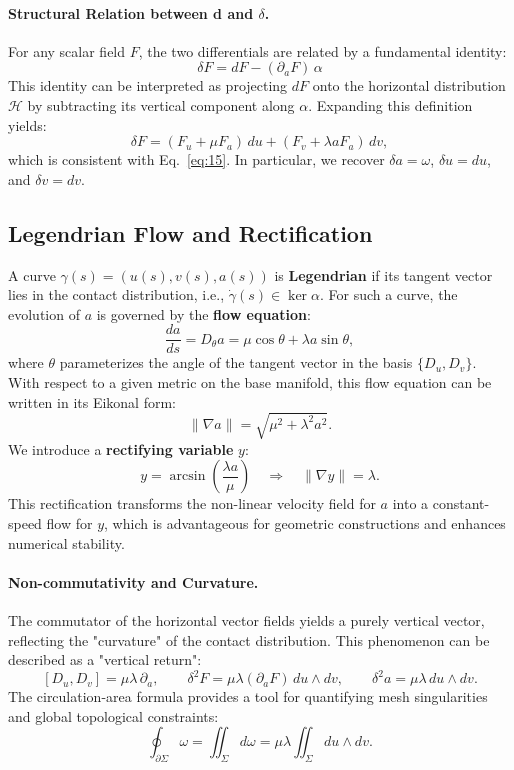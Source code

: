 \paragraph{Structural Relation between d and $\delta$.}
For any scalar field $F$, the two differentials are related by a fundamental identity:
\[
\boxed{ \delta F = dF - (\partial_a F)\,\alpha }
\]
This identity can be interpreted as projecting $dF$ onto the horizontal distribution $\mathcal{H}$ by subtracting its vertical component along $\alpha$. Expanding this definition yields:
\[
\delta F = (F_u + \mu F_a)\,du + (F_v + \lambda a F_a)\,dv,
\]
which is consistent with Eq.~\eqref{eq:15}. In particular, we recover $\delta a = \omega$, $\delta u = du$, and $\delta v = dv$.

\subsection{Legendrian Flow and Rectification}

A curve $\gamma(s) = (u(s), v(s), a(s))$ is \textbf{Legendrian} if its tangent vector lies in the contact distribution, i.e., $\dot\gamma(s) \in \ker\alpha$. For such a curve, the evolution of $a$ is governed by the \textbf{flow equation}:
\begin{equation}\label{eq:4}\tag{4}
\frac{da}{ds} = D_\theta a = \mu\cos\theta + \lambda a\sin\theta,
\end{equation}
where $\theta$ parameterizes the angle of the tangent vector in the basis $\{D_u,D_v\}$. With respect to a given metric on the base manifold, this flow equation can be written in its Eikonal form:
\begin{equation}\label{eq:5}\tag{5}
\|\nabla a\| = \sqrt{\mu^2 + \lambda^2 a^2}.
\end{equation}
We introduce a \textbf{rectifying variable} $y$:
\begin{equation}\label{eq:6}\tag{6}
y = \arcsin\left(\frac{\lambda a}{\mu}\right) \quad\Rightarrow\quad \|\nabla y\| = \lambda.
\end{equation}
This rectification transforms the non-linear velocity field for $a$ into a constant-speed flow for $y$, which is advantageous for geometric constructions and enhances numerical stability.

\paragraph{Non-commutativity and Curvature.}
The commutator of the horizontal vector fields yields a purely vertical vector, reflecting the "curvature" of the contact distribution. This phenomenon can be described as a "vertical return":
\begin{equation}\label{eq:7}\tag{7}
[D_u,D_v] = \mu\lambda\,\partial_a,\qquad \delta^2F = \mu\lambda(\partial_a F)\,du\wedge dv,\qquad \delta^2 a = \mu\lambda\,du\wedge dv.
\end{equation}
The circulation-area formula provides a tool for quantifying mesh singularities and global topological constraints:
\begin{equation}\label{eq:8}\tag{8}
\oint_{\partial\Sigma}\omega = \iint_\Sigma d\omega = \mu\lambda\iint_\Sigma du\wedge dv.
\end{equation}

